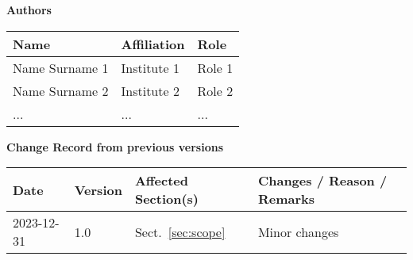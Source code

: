 \documentclass[12pt,a4paper]{article}
\begin{document}



\newpage
\pagestyle{fancy}

\noindent
{\Large \bf Authors}
\medskip

\noindent
\begin{tabularx}{\textwidth}{|l|X|X|}
  \hline
      \rowcolor{lightgray} {\bf Name} & {\bf Affiliation} & {\bf Role}\\
      \hline
      Name Surname 1     & Institute 1 & Role 1\\ \hline
      Name Surname 2     & Institute 2 & Role 2\\ \hline
      ...                & ...         & ...   \\ \hline
\end{tabularx}

\vspace{3cm}

\noindent
{\Large \bf Change Record from previous versions}
\medskip

\noindent
\begin{tabularx}{\textwidth}{|l|l|l|X|}
  \hline
      \rowcolor{lightgray} {\bf Date} & {\bf Version} & {\bf Affected Section(s)} & {\bf Changes / Reason / Remarks}\\  \hline
      2023-12-31 & 1.0 & Sect.~\ref{sec:scope} &  Minor changes \\ \hline
\end{tabularx}


\newpage
\tableofcontents \thispagestyle{fancy}


\newpage





\newpage
\listofreq \thispagestyle{fancy}

\listofquestion \thispagestyle{fancy}


\label{LastPage}
\end{document}
